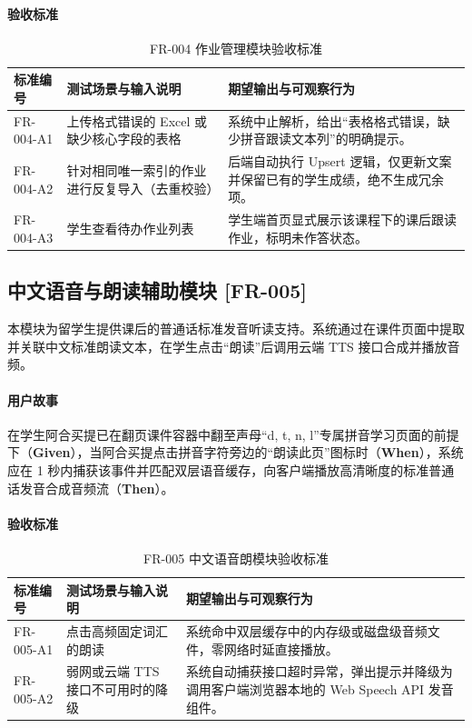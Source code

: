 \paragraph{验收标准}
\begin{table}[H]
\centering
\caption{FR-004 作业管理模块验收标准}
\begin{tabularx}{\textwidth}{l p{5.5cm} X}
\toprule
\textbf{标准编号} & \textbf{测试场景与输入说明} & \textbf{期望输出与可观察行为} \\
\midrule
FR-004-A1 & 上传格式错误的 Excel 或缺少核心字段的表格 & 系统中止解析，给出“表格格式错误，缺少拼音跟读文本列”的明确提示。 \\
FR-004-A2 & 针对相同唯一索引的作业进行反复导入（去重校验） & 后端自动执行 Upsert 逻辑，仅更新文案并保留已有的学生成绩，绝不生成冗余项。 \\
FR-004-A3 & 学生查看待办作业列表 & 学生端首页显式展示该课程下的课后跟读作业，标明未作答状态。 \\
\bottomrule
\end{tabularx}
\end{table}

\subsection{中文语音与朗读辅助模块 [FR-005]}
本模块为留学生提供课后的普通话标准发音听读支持。系统通过在课件页面中提取并关联中文标准朗读文本，在学生点击“朗读”后调用云端 TTS 接口合成并播放音频。
\paragraph{用户故事}
在学生阿合买提已在翻页课件容器中翻至声母“d, t, n, l”专属拼音学习页面的前提下（\textbf{Given}），当阿合买提点击拼音字符旁边的“朗读此页”图标时（\textbf{When}），系统应在 1 秒内捕获该事件并匹配双层语音缓存，向客户端播放高清晰度的标准普通话发音合成音频流（\textbf{Then}）。
\paragraph{验收标准}
\begin{table}[H]
\centering
\caption{FR-005 中文语音朗模块验收标准}
\begin{tabularx}{\textwidth}{l p{5.5cm} X}
\toprule
\textbf{标准编号} & \textbf{测试场景与输入说明} & \textbf{期望输出与可观察行为} \\
\midrule
FR-005-A1 & 点击高频固定词汇的朗读 & 系统命中双层缓存中的内存级或磁盘级音频文件，零网络时延直接播放。 \\
FR-005-A2 & 弱网或云端 TTS 接口不可用时的降级 & 系统自动捕获接口超时异常，弹出提示并降级为调用客户端浏览器本地的 Web Speech API 发音组件。 \\
\bottomrule
\end{tabularx}
\end{table}

